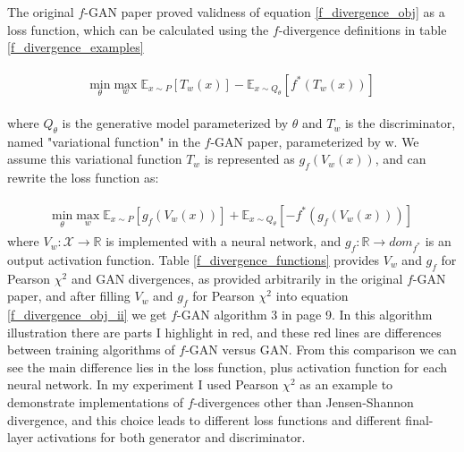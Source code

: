 \documentclass[10pt,twocolumn,letterpaper]{article}
\begin{document}
The original $f$-GAN paper proved validness of equation \ref{f_divergence_obj} as a loss function, which can be calculated using the $f$-divergence definitions in table \ref{f_divergence_examples}

\begin{equation} 
\begin{split}
\begin{aligned}
    \underset{\theta}{\text{min}}\; \underset{w}{\text{max}} \; \mathbb{E}_{x\sim P} [T_w(x)] - \mathbb{E}_{x\sim Q_\theta} [f^*(T_w(x))]
\end{aligned}
\end{split}
\label{f_divergence_obj}
\end{equation}

where $Q_\theta$ is the generative model parameterized by $\theta$ and $T_w$ is the discriminator, named "variational function" in the $f$-GAN paper, parameterized by w. We assume this variational function $T_w$ is represented as $g_f(V_w(x))$, and can rewrite the loss function as:

\begin{equation} 
\begin{split}
\begin{aligned}
    \underset{\theta}{\text{min}}\; \underset{w}{\text{max}} \; \mathbb{E}_{x\sim P} [g_f(V_w(x))] + \mathbb{E}_{x\sim Q_\theta} [-f^*(g_f(V_w(x)))]
\end{aligned}
\end{split}
\label{f_divergence_obj_ii}
\end{equation}
where $V_w: \mathcal{X} \xrightarrow{} \mathbb{R}$ is implemented with a neural network, and $g_f: \mathbb{R} \xrightarrow{} dom_{f^*}$ is an output activation function. Table \ref{f_divergence_functions} provides $V_w$ and $g_f$ for Pearson $\chi^2$ and GAN divergences, as provided arbitrarily in the original $f$-GAN paper, and after filling $V_w$ and $g_f$ for Pearson $\chi^2$ into equation \ref{f_divergence_obj_ii} we get $f$-GAN algorithm 3 in page 9. In this algorithm illustration there are parts I highlight in red, and these red lines are differences between training algorithms of $f$-GAN versus GAN. From this comparison we can see the main difference lies in the loss function, plus activation function for each neural network. In my experiment I used Pearson $\chi^2$ as an example to demonstrate implementations of $f$-divergences other than Jensen-Shannon divergence, and this choice leads to different loss functions and different final-layer activations for both generator and discriminator.  
\end{document}
